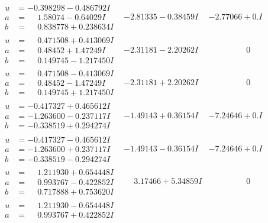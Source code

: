 \documentclass[1p]{elsarticle_modified}
\theoremstyle{definition}
\begin{document}
$$\begin{array}{c|c|c}
 \hline 
\begin{aligned}
u &= -0.398298 - 0.486792 I \\
a &= \phantom{-}1.58074 - 0.64029 I \\
b &= \phantom{-}0.838778 + 0.238634 I\end{aligned}
 & -2.81335 - 0.38459 I & -2.77066 + 0. I\phantom{ +0.000000I} \\ \hline\begin{aligned}
u &= \phantom{-}0.471508 + 0.413069 I \\
a &= \phantom{-}0.48452 + 1.47249 I \\
b &= \phantom{-}0.149745 - 1.217450 I\end{aligned}
 & -2.31181 - 2.20262 I & \phantom{-0.000000 } 0 \\ \hline\begin{aligned}
u &= \phantom{-}0.471508 - 0.413069 I \\
a &= \phantom{-}0.48452 - 1.47249 I \\
b &= \phantom{-}0.149745 + 1.217450 I\end{aligned}
 & -2.31181 + 2.20262 I & \phantom{-0.000000 } 0 \\ \hline\begin{aligned}
u &= -0.417327 + 0.465612 I \\
a &= -1.263600 - 0.237117 I \\
b &= -0.338519 + 0.294274 I\end{aligned}
 & -1.49143 + 0.36154 I & -7.24646 + 0. I\phantom{ +0.000000I} \\ \hline\begin{aligned}
u &= -0.417327 - 0.465612 I \\
a &= -1.263600 + 0.237117 I \\
b &= -0.338519 - 0.294274 I\end{aligned}
 & -1.49143 - 0.36154 I & -7.24646 + 0. I\phantom{ +0.000000I} \\ \hline\begin{aligned}
u &= \phantom{-}1.211930 + 0.654448 I \\
a &= \phantom{-}0.993767 - 0.422852 I \\
b &= \phantom{-}0.717888 + 0.753620 I\end{aligned}
 & \phantom{-}3.17466 + 5.34859 I & \phantom{-0.000000 } 0 \\ \hline\begin{aligned}
u &= \phantom{-}1.211930 - 0.654448 I \\
a &= \phantom{-}0.993767 + 0.422852 I \\

\end{aligned}
\end{array}$$
\end{document}
